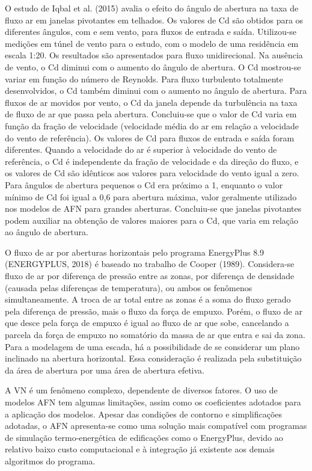 \documentclass[brazil,hardcopy,openany,a5paper]{ufscthesis}
\begin{document}
	O estudo de Iqbal et al. (2015) avalia o efeito do ângulo de abertura na taxa de fluxo ar em janelas pivotantes em telhados. Os valores de Cd são obtidos para os diferentes ângulos, com e sem vento, para fluxos de entrada e saída. Utilizou-se medições em túnel de vento para o estudo, com o modelo de uma residência em escala 1:20. Os resultados são apresentados para fluxo unidirecional. Na ausência de vento, o Cd diminui com o aumento do ângulo de abertura. O Cd mostrou-se variar em função do número de Reynolds. Para fluxo turbulento totalmente desenvolvidos, o Cd também diminui com o aumento no ângulo de abertura. Para fluxos de ar movidos por vento, o Cd da janela depende da turbulência na taxa de fluxo de ar que passa pela abertura. Concluiu-se que o valor de Cd varia em função da fração de velocidade (velocidade média do ar em relação a velocidade do vento de referência). Os valores de Cd para fluxos de entrada e saída foram diferentes. Quando a velocidade do ar é superior à velocidade do vento de referência, o Cd é independente da fração de velocidade e da direção do fluxo, e os valores de Cd são idênticos aos valores para velocidade do vento igual a zero. Para ângulos de abertura pequenos o Cd era próximo a 1, enquanto o valor mínimo de Cd foi igual a 0,6 para abertura máxima, valor geralmente utilizado nos modelos de AFN para grandes aberturas. Concluiu-se que janelas pivotantes podem auxiliar na obtenção de valores maiores para o Cd, que varia em relação ao ângulo de abertura.
	
	O fluxo de ar por aberturas horizontais pelo programa EnergyPlus 8.9 (ENERGYPLUS, 2018) é baseado no trabalho de Cooper (1989). Considera-se fluxo de ar por diferença de pressão entre as zonas, por diferença de densidade (causada pelas diferenças de temperatura), ou ambos os fenômenos simultaneamente. A troca de ar total entre as zonas é a soma do fluxo gerado pela diferença de pressão, mais o fluxo da força de empuxo. Porém, o fluxo de ar que desce pela força de empuxo é igual ao fluxo de ar que sobe, cancelando a parcela da força de empuxo no somatório da massa de ar que entra e sai da zona. Para a modelagem de uma escada, há a possibilidade de se considerar um plano inclinado na abertura horizontal. Essa consideração é realizada pela substituição da área de abertura por uma área de abertura efetiva.
	
	A VN é um fenômeno complexo, dependente de diversos fatores. O uso de modelos AFN tem algumas limitações, assim como os coeficientes adotados para a aplicação dos modelos. Apesar das condições de contorno e simplificações adotadas, o AFN apresenta-se como uma solução mais compatível com programas de simulação termo-energética de edificações como o EnergyPlus, devido ao relativo baixo custo computacional e à integração já	existente aos demais algoritmos do programa.
	
\end{document}
